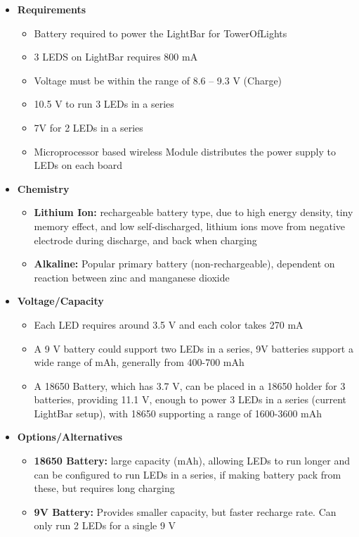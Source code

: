 \documentclass[12pt]{article}
\begin{document}
		{\renewcommand\labelitemi{}
			\begin{itemize}
				\item \textbf{Requirements}
					\begin{itemize}
						\item Battery required to power the LightBar for TowerOfLights
						\item 3 LEDS on LightBar requires 800 mA
						\item Voltage must be within the range of 8.6 – 9.3 V (Charge)
						\item 10.5 V to run 3 LEDs in a series
						\item 7V for 2 LEDs in a series
						\item Microprocessor based wireless Module distributes the power supply to LEDs on each board
					\end{itemize}
				\item \textbf{Chemistry}
					\begin{itemize}
						\item \textbf{Lithium Ion:} rechargeable battery type, due to high energy density, tiny memory effect, and low self-discharged, lithium ions move from negative electrode during discharge, and back when charging
						\item \textbf{Alkaline:} Popular primary battery (non-rechargeable), dependent on reaction between zinc and manganese dioxide
					\end{itemize}
				\item \textbf{Voltage/Capacity}
					\begin{itemize}
						\item Each LED requires around 3.5 V and each color takes 270 mA
						\item A 9 V battery could support two LEDs in a series, 9V batteries support a wide range of mAh, generally from 400-700 mAh
						\item A 18650 Battery, which has 3.7 V, can be placed in a 18650 holder for 3 batteries, providing 11.1 V, enough to power 3 LEDs in a series (current LightBar setup), with 18650 supporting a range of 1600-3600 mAh
					\end{itemize}
				\item \textbf{Options/Alternatives}
					\begin{itemize}
						\item \textbf{18650 Battery:} large capacity (mAh), allowing LEDs to run longer and can be configured to run LEDs in a series, if making battery pack from these, but requires long charging
						\item \textbf{9V Battery:} Provides smaller capacity, but faster recharge rate. Can only run 2 LEDs for a single 9 V
					\end{itemize}
			\end{itemize}
	
}
\end{document}
